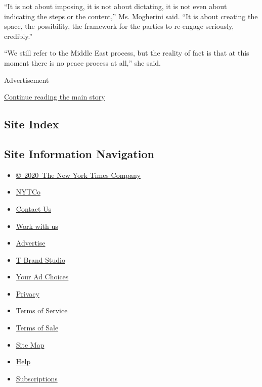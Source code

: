 ``It is not about imposing, it is not about dictating, it is not even
about indicating the steps or the content,'' Ms. Mogherini said. ``It is
about creating the space, the possibility, the framework for the parties
to re-engage seriously, credibly.''

``We still refer to the Middle East process, but the reality of fact is
that at this moment there is no peace process at all,'' she said.

Advertisement

\protect\hyperlink{after-bottom}{Continue reading the main story}

\hypertarget{site-index}{%
\subsection{Site Index}\label{site-index}}

\hypertarget{site-information-navigation}{%
\subsection{Site Information
Navigation}\label{site-information-navigation}}

\begin{itemize}
\tightlist
\item
  \href{https://help.nytimes.com/hc/en-us/articles/115014792127-Copyright-notice}{©~2020~The
  New York Times Company}
\end{itemize}

\begin{itemize}
\tightlist
\item
  \href{https://www.nytco.com/}{NYTCo}
\item
  \href{https://help.nytimes.com/hc/en-us/articles/115015385887-Contact-Us}{Contact
  Us}
\item
  \href{https://www.nytco.com/careers/}{Work with us}
\item
  \href{https://nytmediakit.com/}{Advertise}
\item
  \href{http://www.tbrandstudio.com/}{T Brand Studio}
\item
  \href{https://www.nytimes.com/privacy/cookie-policy\#how-do-i-manage-trackers}{Your
  Ad Choices}
\item
  \href{https://www.nytimes.com/privacy}{Privacy}
\item
  \href{https://help.nytimes.com/hc/en-us/articles/115014893428-Terms-of-service}{Terms
  of Service}
\item
  \href{https://help.nytimes.com/hc/en-us/articles/115014893968-Terms-of-sale}{Terms
  of Sale}
\item
  \href{https://spiderbites.nytimes.com}{Site Map}
\item
  \href{https://help.nytimes.com/hc/en-us}{Help}
\item
  \href{https://www.nytimes.com/subscription?campaignId=37WXW}{Subscriptions}
\end{itemize}
